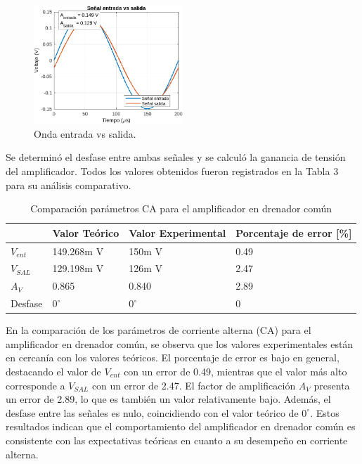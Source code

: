 \documentclass[journal]{IEEEtran}
\begin{document}
	\begin{figure}[H]
		\centering
		\includegraphics[width=0.5\textwidth]{Media/onda_entrada_salida.png}
		\caption{Onda entrada vs salida.}
		\label{fig:onda_entrada_salida.}
	\end{figure}
	\par Se determinó el desfase entre ambas señales y se calculó la ganancia de tensión del amplificador. Todos los valores obtenidos fueron registrados en la Tabla 3 para su análisis comparativo.
	\begin{table}[h]
		\caption{Comparación parámetros CA para el amplificador en drenador común}
		\centering
		\renewcommand{\arraystretch}{1.2} %
		\begin{tabular}{|l|p{2cm}|p{2cm}|p{2cm}|}
			\hline
			& \textbf{Valor Teórico} & \textbf{Valor Experimental} & \textbf{Porcentaje de error [\%]} \\
			\hline
			\( V_{ent}\) & 149.268m V   & 150m V  & 0.49 \\
			\hline
			\( V_{SAL} \) & 129.198m V    & 126m V  & 2.47 \\
			\hline
			\( A_V \) & 0.865 & 0.840 & 2.89 \\
			\hline
			Desfase & $0^\circ$ & $0^\circ$ & 0 \\
			\hline
		\end{tabular}
		\label{tab:resistencias}
	\end{table}
	\par En la comparación de los parámetros de corriente alterna (CA) para el amplificador en drenador común, se observa que los valores experimentales están en cercanía con los valores teóricos. El porcentaje de error es bajo en general, destacando el valor de \( V_{ent}\) con un error de 0.49, mientras que el valor más alto corresponde a \( V_{SAL} \) con un error de 2.47. El factor de amplificación \( A_V \) presenta un error de 2.89, lo que es también un valor relativamente bajo. Además, el desfase entre las señales es nulo, coincidiendo con el valor teórico de $0^\circ$. Estos resultados indican que el comportamiento del amplificador en drenador común es consistente con las expectativas teóricas en cuanto a su desempeño en corriente alterna.
\end{document}

